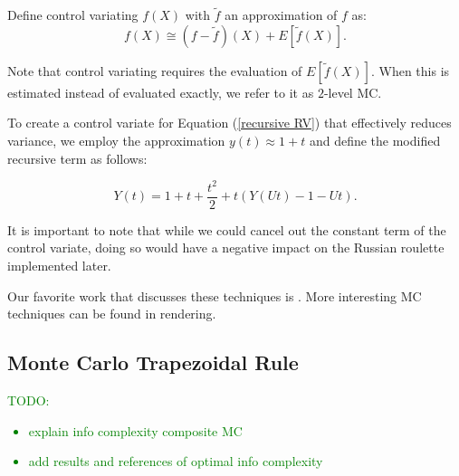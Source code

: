 \documentclass[a4paper,12pt]{article}
\begin{document}
\begin{definition} \label{CV}
    Define control variating $f(X)$ with $\tilde{f}$ an approximation of $f$ as:
    \begin{equation}
        f(X) \cong (f-\tilde{f})(X) + E[\tilde{f}(X)].
    \end{equation}

    Note that control variating requires the evaluation of
    $E[\tilde{f}(X)]$. When this is estimated instead of evaluated
    exactly, we refer to it as $2$-level MC.
\end{definition}


\begin{example} \label{ex:CV}
    To create a control variate for Equation (\ref{recursive RV}) that
    effectively reduces variance, we employ the approximation
    $y(t) \approx 1+t$ and define the modified recursive term as follows:

    \begin{equation}
        Y(t) = 1 + t + \frac{t^2}{2} + t(Y(Ut) - 1 - Ut).
    \end{equation}

    It is important to note that while we could cancel out the constant term
    of the control variate, doing so would have a negative impact on
    the Russian roulette implemented later.
\end{example}

\vspace*{0.2cm}
\begin{pythonn}
\end{pythonn}

\begin{related}[MC modification]
    Our favorite work that discusses these techniques is \cite{veach_robust_1997}.
    More interesting MC techniques can be found in rendering.
\end{related}

\subsection{Monte Carlo Trapezoidal Rule}

\textcolor{green}{
    TODO:
    \begin{itemize}
        \item explain info complexity composite MC
        \item add results and references of optimal info complexity
    \end{itemize}
}
\end{document}
